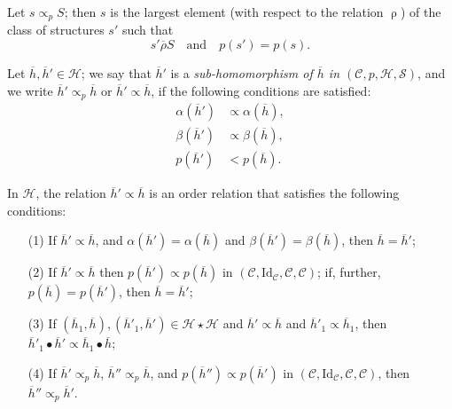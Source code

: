 \documentclass[a4paper,fleqn]{article}
\theoremstyle{plain}
\newenvironment{proposition}[1]
  {\renewcommand\theinnerproposition{#1}\innerproposition}
  {\endinnerproposition}
\newenvironment{corollary}[1]
  {\renewcommand\theinnercorollary{#1}\innercorollary}
  {\endinnercorollary}
\theoremstyle{definition}
\newenvironment{definition}[1]
  {\renewcommand\theinnerdefinition{#1}\innerdefinition}
  {\endinnerdefinition}
\newcommand{\textand}{\quad\text{and}\quad}
\newcommand{\CC}{\mathcal{C}}
\newcommand{\HH}{\mathcal{H}}
\renewcommand{\SS}{\mathcal{S}}
\newcommand{\relrho}{\mathrel{\rho}}
\newcommand{\relrhobar}{\mathrel{\overline{\rho}}}
\newcommand{\subs}{\mathrel{\propto}}
\newcommand{\Id}{\mathrm{Id}}
\newcommand{\smallbullet}{\bullet}
\begin{document}
\begin{corollary}{2}
  Let $s\subs_p S$;
  then $s$ is the largest element (with respect to the relation $\relrho$) of the class of structures $s'$ such that
  \[
    s'\relrhobar S
    \textand
    p(s') = p(s).
  \]
\end{corollary}

\begin{definition}{8}
\label{definition:i-8}
  Let $\overline{h},\overline{h}'\in\HH$;
  we say that $\overline{h}'$ is a \emph{sub-homomorphism of $\overline{h}$ in $(\CC,p,\HH,\SS)$}, and we write $\overline{h}'\subs_p\overline{h}$ or $\overline{h}'\subs\overline{h}$, if the following conditions are satisfied:
  \[
    \begin{aligned}
      \alpha(\overline{h}')
      &\subs \alpha(\overline{h}),
    \\\beta(\overline{h}')
      &\subs \beta(\overline{h}),
    \\p(\overline{h}')
      &< p(\overline{h}).
    \end{aligned}
  \]
\end{definition}

\begin{proposition}{5}
\label{proposition:i-5}
  In $\HH$, the relation $\overline{h}'\subs\overline{h}$ is an order relation that satisfies the following conditions:
  \begin{enumerate}
    \item[\normalfont(1)]
      If $\overline{h}'\subs\overline{h}$, and $\alpha(\overline{h}')=\alpha(\overline{h})$ and $\beta(\overline{h}')=\beta(\overline{h})$, then $\overline{h}=\overline{h}'$;
    \item[\normalfont(2)]
      If $\overline{h}'\subs\overline{h}$ then $p(\overline{h}')\subs p(\overline{h})$ in $(\CC,\Id_\CC,\CC,\CC)$;
      if, further, $p(\overline{h})=p(\overline{h}')$, then $\overline{h}=\overline{h}'$;
    \item[\normalfont(3)]
      If $(\overline{h}_1,\overline{h}),(\overline{h}'_1,\overline{h}')\in\HH\star\HH$ and $\overline{h}'\subs\overline{h}$ and $\overline{h}'_1\subs\overline{h}_1$, then $\overline{h}'_1\smallbullet\overline{h}'\subs\overline{h}_1\smallbullet\overline{h}$;
    \item[\normalfont(4)]
      If $\overline{h}'\subs_p\overline{h}$, $\overline{h}''\subs_p\overline{h}$, and $p(\overline{h}'')\subs p(\overline{h}')$ in $(\CC,\Id_\CC,\CC,\CC)$, then $\overline{h}''\subs_p\overline{h}'$.
  \end{enumerate}
\end{proposition}
\end{document}
